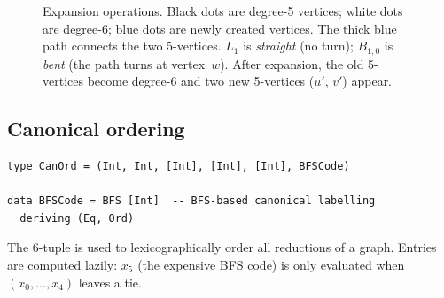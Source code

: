 \documentclass[11pt,a4paper]{article}
\theoremstyle{definition}
\begin{document}
\begin{figure}[ht]
\caption{Expansion operations.  Black dots are degree-5 vertices; white
dots are degree-6; blue dots are newly created vertices.  The thick
blue path connects the two 5-vertices.  $L_1$ is \emph{straight}
(no turn); $B_{1,0}$ is \emph{bent} (the path turns at vertex~$w$).
After expansion, the old 5-vertices become degree-6 and two new
5-vertices ($u'$, $v'$) appear.}
\label{fig:expansions}
\end{figure}

\subsection{Canonical ordering}
\label{sec:canonical-ord}

\begin{lstlisting}
type CanOrd = (Int, Int, [Int], [Int], [Int], BFSCode)

data BFSCode = BFS [Int]  -- BFS-based canonical labelling
  deriving (Eq, Ord)
\end{lstlisting}

The 6-tuple is used to lexicographically order all reductions of a
graph.  Entries are computed lazily: $x_5$ (the expensive BFS code) is
only evaluated when $(x_0, \ldots, x_4)$ leaves a tie.
\end{document}
